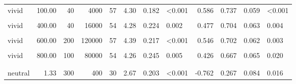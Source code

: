 \documentclass[
]{article}
\begin{document}
\begin{longtable}[t]{lrrrrrrlrrrl}
\hspace{1em}vivid & 100.00 & 40 & 4000 & 57 & 4.30 & 0.182 & <0.001 & 0.586 & 0.737 & 0.059 & <0.001\\
\hspace{1em}\cellcolor{gray!10}{vivid} & \cellcolor{gray!10}{400.00} & \cellcolor{gray!10}{10} & \cellcolor{gray!10}{4000} & \cellcolor{gray!10}{57} & \cellcolor{gray!10}{4.72} & \cellcolor{gray!10}{0.183} & \cellcolor{gray!10}{<0.001} & \cellcolor{gray!10}{0.888} & \cellcolor{gray!10}{0.825} & \cellcolor{gray!10}{0.051} & \cellcolor{gray!10}{<0.001}\\
\hspace{1em}vivid & 400.00 & 40 & 16000 & 54 & 4.28 & 0.224 & 0.002 & 0.477 & 0.704 & 0.063 & 0.004\\
\hspace{1em}\cellcolor{gray!10}{vivid} & \cellcolor{gray!10}{600.00} & \cellcolor{gray!10}{20} & \cellcolor{gray!10}{12000} & \cellcolor{gray!10}{54} & \cellcolor{gray!10}{4.17} & \cellcolor{gray!10}{0.240} & \cellcolor{gray!10}{0.011} & \cellcolor{gray!10}{0.382} & \cellcolor{gray!10}{0.667} & \cellcolor{gray!10}{0.065} & \cellcolor{gray!10}{0.020}\\
\hspace{1em}vivid & 600.00 & 200 & 120000 & 57 & 4.39 & 0.217 & <0.001 & 0.546 & 0.702 & 0.062 & 0.003\\
\hspace{1em}\cellcolor{gray!10}{vivid} & \cellcolor{gray!10}{800.00} & \cellcolor{gray!10}{30} & \cellcolor{gray!10}{24000} & \cellcolor{gray!10}{57} & \cellcolor{gray!10}{4.67} & \cellcolor{gray!10}{0.193} & \cellcolor{gray!10}{<0.001} & \cellcolor{gray!10}{0.808} & \cellcolor{gray!10}{0.860} & \cellcolor{gray!10}{0.047} & \cellcolor{gray!10}{<0.001}\\
\hspace{1em}vivid & 800.00 & 100 & 80000 & 54 & 4.26 & 0.245 & 0.005 & 0.426 & 0.667 & 0.065 & 0.020\\
\addlinespace[0.3em]
\multicolumn{12}{l}{\textbf{Exp. 4 (filtered)}}\\
\hspace{1em}\cellcolor{gray!10}{neutral} & \cellcolor{gray!10}{1.33} & \cellcolor{gray!10}{30} & \cellcolor{gray!10}{40} & \cellcolor{gray!10}{28} & \cellcolor{gray!10}{2.04} & \cellcolor{gray!10}{0.213} & \cellcolor{gray!10}{<0.001} & \cellcolor{gray!10}{-1.325} & \cellcolor{gray!10}{0.107} & \cellcolor{gray!10}{0.061} & \cellcolor{gray!10}{<0.001}\\
\hspace{1em}neutral & 1.33 & 300 & 400 & 30 & 2.67 & 0.203 & <0.001 & -0.762 & 0.267 & 0.084 & 0.016\\

\end{longtable}
\end{document}
